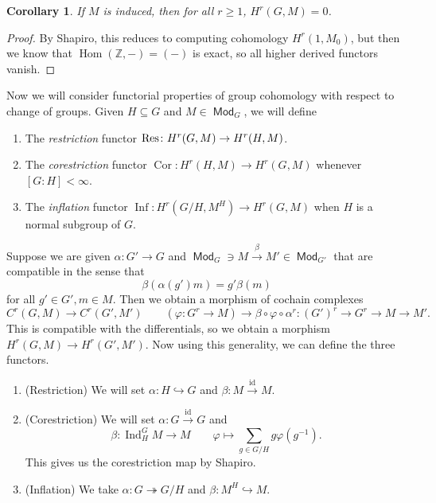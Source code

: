 \documentclass[leqno, openany]{memoir}
\newtheorem{cor}[thm]{Corollary}
\theoremstyle{definition}
\theoremstyle{remark}
\theoremstyle{plain}
\theoremstyle{definition}
\theoremstyle{remark}
\newcommand{\Z}{\mathbb{Z}}
\newcommand{\mr}[1]{\mathrm{#1}}
\DeclareMathOperator{\Hom}{Hom}
\DeclareMathOperator{\Mod}{\mathsf{Mod}}
\DeclareMathOperator{\Ind}{Ind}
\DeclareMathOperator{\Inf}{Inf}
\DeclareMathOperator{\Cor}{Cor}
\begin{document}
\begin{cor}
    If $M$ is induced, then for all $r \geq 1$, $H^r(G, M) = 0$.
\end{cor}

\begin{proof}
    By Shapiro, this reduces to computing cohomology $H^r(1, M_0)$, but then we know that $\Hom(\Z, -) = (-)$ is exact, so all higher derived functors vanish.
\end{proof}

Now we will consider functorial properties of group cohomology with respect to change of groups. Given $H \subseteq G$ and $M \in \Mod_G$, we will define
\begin{enumerate}
    \item The \textit{restriction} functor $\Res \colon H^r(G, M) \to H^r(H, M)$.
    \item The \textit{corestriction} functor $\Cor \colon H^r(H, M) \to H^r(G, M)$ whenever $[G:H] < \infty$.
    \item The \textit{inflation} functor $\Inf \colon H^r(G/H, M^H) \to H^r(G, M)$ when $H$ is a normal subgroup of $G$.
\end{enumerate}

Suppose we are given $\alpha \colon G' \to G$ and $\Mod_G \ni M \xrightarrow{\beta} M' \in \Mod_{G'}$ that are compatible in the sense that
\[ \beta(\alpha(g')m) = g' \beta (m) \]
for all $g' \in G', m \in M$. Then we obtain a morphism of cochain complexes 
\[ C^r(G, M) \to C^r(G', M') \qquad (\varphi \colon G^r \to M) \to \beta \circ \varphi \circ \alpha^r \colon {(G')}^r \to G^r \to M \to M'. \]
This is compatible with the differentials, so we obtain a morphism $H^r(G, M) \to H^r(G', M')$. Now using this generality, we can define the three functors.

\begin{enumerate}
    \item (Restriction) We will set $\alpha \colon H \hookrightarrow G$ and $\beta \colon M \xrightarrow{\mr{id}} M$.
    \item (Corestriction) We will set $\alpha \colon G \xrightarrow{\mr{id}} G$ and 
        \[ \beta \colon \Ind_H^G M \to M \qquad \varphi \mapsto \sum_{g \in G/H} g \varphi(g^{-1}). \]
        This gives us the corestriction map by Shapiro.
    \item (Inflation) We take $\alpha \colon G \twoheadrightarrow G/H$ and $\beta \colon M^H \hookrightarrow M$.
\end{enumerate}
\end{document}
